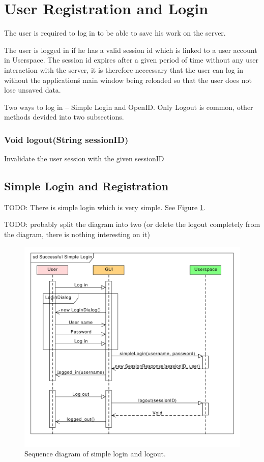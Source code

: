 \section{User Registration and Login}

The user is required to log in to be able to save his work on the server.

The user is logged in if he has a valid session id which is linked to a user account in Userspace.
The session id expires after a given period of time without any user interaction with the server,
it is therefore neccessary that the user can log in without the application\'s main window being reloaded so that the user does not lose unsaved data.

Two ways to log in -- Simple Login and OpenID. Only Logout is common, other methods devided into two subsections.


\subsubsection{Void logout(String sessionID)}
Invalidate the user session with the given sessionID


\subsection{Simple Login and Registration}
\label{subsec:simple_login}

TODO: There is simple login which is very simple. See Figure \ref{gui:sd:simple_login}.

TODO: probably split the diagram into two (or delete the logout completely from the diagram, there is nothing interesting on it)

\begin{figure}[h]
\begin{center}
\includegraphics[scale=0.65]{figures/simple_login_sequence.pdf}
\end{center}
\caption{Sequence diagram of simple login and logout.}\label{gui:sd:simple_login}
\end{figure}

